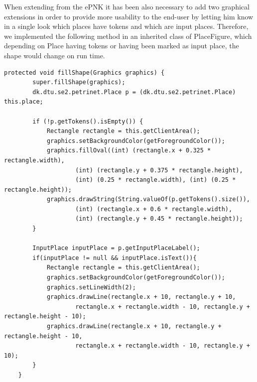 When extending from the ePNK it has been also necessary to add two graphical extensions in order to provide more usability to the end-user by letting him know in a single look which places have tokens and which are input places. Therefore, we implemented the following method in an inherited class of PlaceFigure, which depending on Place having tokens or having been marked as input place, the shape would change on run time.
\begin{lstlisting}
protected void fillShape(Graphics graphics) {
		super.fillShape(graphics);
		dk.dtu.se2.petrinet.Place p = (dk.dtu.se2.petrinet.Place) this.place;
		
		if (!p.getTokens().isEmpty()) {
			Rectangle rectangle = this.getClientArea();
			graphics.setBackgroundColor(getForegroundColor());
			graphics.fillOval((int) (rectangle.x + 0.325 * rectangle.width), 
					(int) (rectangle.y + 0.375 * rectangle.height),
					(int) (0.25 * rectangle.width), (int) (0.25 * rectangle.height));
			graphics.drawString(String.valueOf(p.getTokens().size()), 
					(int) (rectangle.x + 0.6 * rectangle.width), 
					(int) (rectangle.y + 0.45 * rectangle.height));
		}
		
		InputPlace inputPlace = p.getInputPlaceLabel();
		if(inputPlace != null && inputPlace.isText()){
			Rectangle rectangle = this.getClientArea();
			graphics.setBackgroundColor(getForegroundColor());
			graphics.setLineWidth(2);
			graphics.drawLine(rectangle.x + 10, rectangle.y + 10, 
					rectangle.x + rectangle.width - 10, rectangle.y + rectangle.height - 10);
			graphics.drawLine(rectangle.x + 10, rectangle.y + rectangle.height - 10, 
					rectangle.x + rectangle.width - 10, rectangle.y + 10);
		}
	}
\end{lstlisting}